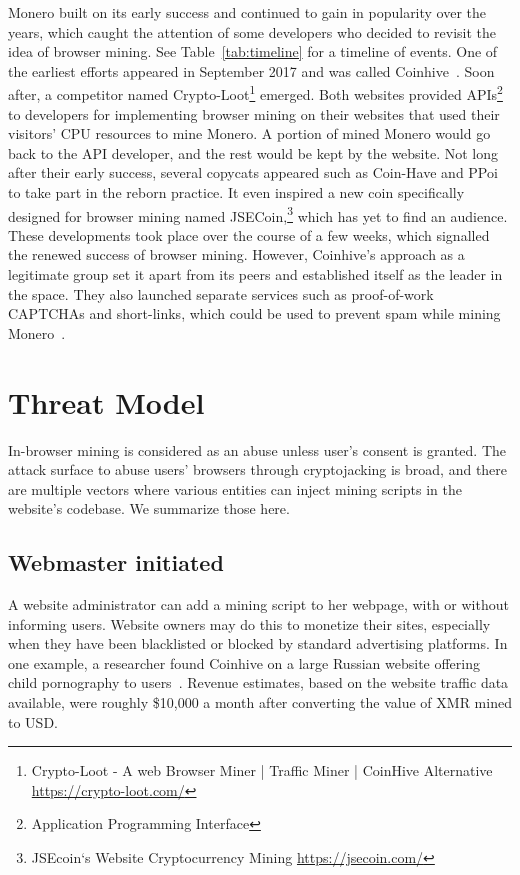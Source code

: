 

Monero built on its early success and continued to gain in popularity over the years, which caught the attention of some developers who decided to revisit the idea of browser mining. See Table~\ref{tab:timeline} for a timeline of events.  One of the earliest efforts appeared in September 2017 and was called Coinhive~\cite{coinhive}. Soon after, a competitor named Crypto-Loot\footnote{Crypto-Loot - A web Browser Miner | Traffic Miner | CoinHive Alternative \url{https://crypto-loot.com/}} emerged. Both websites provided APIs\footnote{Application Programming Interface} to developers for implementing browser mining on their websites that used their visitors' CPU resources to mine Monero. A portion of mined Monero would go back to the API developer, and the rest would be kept by the website. Not long after their early success, several copycats appeared such as Coin-Have and PPoi~\cite{coinhivecopycats} to take part in the reborn practice. It even inspired a new coin specifically designed for browser mining named JSECoin,\footnote{JSEcoin`s Website Cryptocurrency Mining \url{https://jsecoin.com/}} which has yet to find an audience. These developments took place over the course of a few weeks, which signalled the renewed success of browser mining. However, Coinhive's approach as a legitimate group set it apart from its peers and established itself as the leader in the space. They also launched separate services such as proof-of-work CAPTCHAs and short-links, which could be used to prevent spam while mining Monero~\cite{coinhive}.





\section{Threat Model}
In-browser mining is considered as an abuse unless user's consent is granted. The attack surface to abuse users' browsers through cryptojacking is broad, and there are multiple vectors where various entities can inject mining scripts in the website's codebase. We summarize those here. 

\subsection{Webmaster initiated} 

A website administrator can add a mining script to her webpage, with or without informing users. Website owners may do this to monetize their sites, especially when they have been blacklisted or blocked by standard advertising platforms. In one example, a researcher found Coinhive on a large Russian website offering child pornography to users~\cite{coinhiveonchildporn}. Revenue estimates, based on the website traffic data available, were roughly \$10,000 a month after converting the value of XMR mined to USD.

